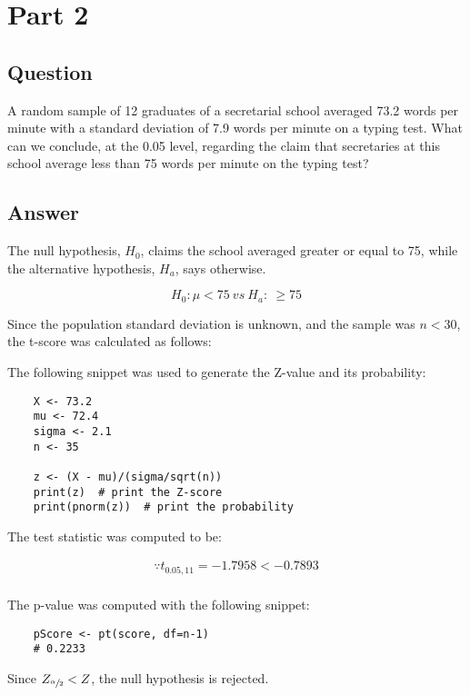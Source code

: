 \section{Part 2}
    \subsection{Question}
    A random sample of 12 graduates of a secretarial school averaged 73.2 words per minute with a standard deviation of 7.9 words per minute on a typing test. What can we conclude, at the 0.05 level, regarding the claim that secretaries at this school average less than 75 words per minute on the typing test?

    \subsection{Answer}
    The null hypothesis, $H_{0}$, claims the school averaged greater or equal to 75, while the alternative hypothesis, $H_{a}$, says otherwise.

        \[ H_{0}: \mu < 75 \ vs \ H_{a}: \ \geq 75 \]

    Since the population standard deviation is unknown, and the sample was $n < 30$, the t-score was calculated as follows:

        

    The following snippet was used to generate the Z-value and its probability:
\begin{lstlisting}
    X <- 73.2
    mu <- 72.4
    sigma <- 2.1
    n <- 35

    z <- (X - mu)/(sigma/sqrt(n))
    print(z)  # print the Z-score
    print(pnorm(z))  # print the probability
\end{lstlisting}

    The test statistic was computed to be:

        \begin{align*}
            \because t_{0.05,11}=-1.7958 < -0.7893\\
        \end{align*}

    The p-value was computed with the following snippet:
\begin{lstlisting}
    pScore <- pt(score, df=n-1)
    # 0.2233
\end{lstlisting}

    Since $Z_{\sfrac{\alpha}{2}} < Z$, the null hypothesis is rejected.
